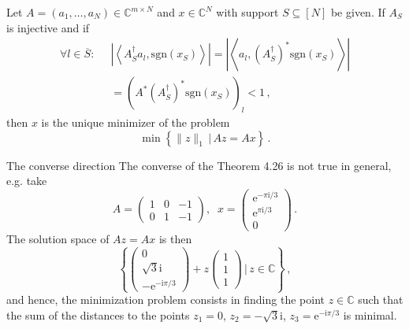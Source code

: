\documentclass[11pt]{beamer}
\newcommand{\CC}{\mathbb{C}}
\newcommand{\sgn}{\text{sgn}}
\newcommand{\p}[2]{\left\langle #1,#2\right\rangle}
\newcommand{\I}{\mathrm{i}}
\newcommand{\e}{\mathrm{e}}
\begin{document}
\begin{frame}
		\begin{Kor}
			{}{}Let \(A=(a_1,\ldots,a_N)\in\CC^{m\times N}\) and \(x\in\CC^N\) with support \(S\subseteq[N]\) be given. If \(A_S\) is injective and if 
			\begin{align*}
			\forall l\in \overline S:\;\;&\left|\p{A_S^{\dagger}a_l}{\sgn(x_S)}\right|=\left|\p{a_l}{(A_S^{\dagger})^*\sgn(x_S)}\right|\\
			&=\left(A^*(A_S^{\dagger})^*\sgn(x_S)\right)_l<1\,,
			\end{align*}
			then \(x\) is the unique minimizer of the problem
			\[\min\left\{\|z\|_1\,\big|\,Az=Ax\right\}\,.\]
		\end{Kor}

\end{frame}

\begin{frame}{The converse direction}
	 The converse of the Theorem 4.26 is not true in general, e.g. take 
		\[ A=\begin{pmatrix}1&0&-1\\0&1&-1\end{pmatrix}, \;\;x=\begin{pmatrix}\e^{-\pi \I/3}\\\e^{\pi \I/3}\\0\end{pmatrix}\,.\]
		The solution space of $Az=Ax$ is then 
		\[\left\{\begin{pmatrix}
		0\\\sqrt 3 \I\\-\e^{-\I \pi/3}
		\end{pmatrix}+z\begin{pmatrix}
		1\\1\\1
		\end{pmatrix}\,\bigg|\, z\in \CC\right\}\,,\]
		and hence, the minimization problem consists in finding the point \(z\in \CC\) such that the sum of the distances to the points \(z_1=0\), \(z_2=-\sqrt 3\I\), \(z_3=\e^{-\I \pi/3}\) is minimal.
\end{frame}
\end{document}
